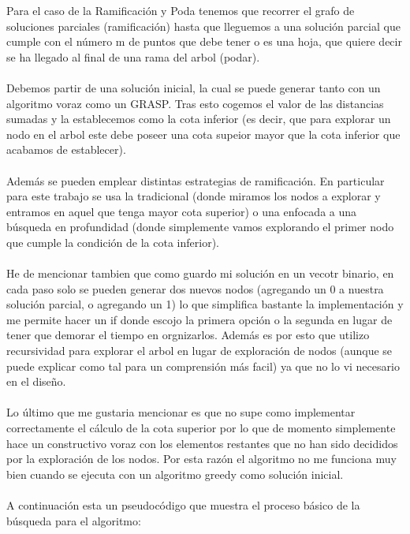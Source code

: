 Para el caso de la Ramificación y Poda tenemos que recorrer el grafo de soluciones parciales (ramificación) hasta que lleguemos a una solución parcial que cumple con el número m de puntos que debe tener o es una hoja, que quiere decir se ha llegado al final de una rama del arbol (podar).
\\
\\
Debemos partir de una solución inicial, la cual se puede generar tanto con un algoritmo voraz como un GRASP. Tras esto cogemos el valor de las distancias sumadas y la establecemos como la cota inferior (es decir, que para explorar un nodo en el arbol este debe poseer una cota supeior mayor que la cota inferior que acabamos de establecer).
\\
\\
Además se pueden emplear distintas estrategias de ramificación. En particular para este trabajo se usa la tradicional (donde miramos los nodos a explorar y entramos en aquel que tenga mayor cota superior) o una enfocada a una búsqueda en profundidad (donde simplemente vamos explorando el primer nodo que cumple la condición de la cota inferior).
\\
\\
He de mencionar tambien que como guardo mi solución en un vecotr binario, en cada paso solo se pueden generar dos nuevos nodos (agregando un 0 a nuestra solución parcial, o agregando un 1) lo que simplifica bastante la implementación y me permite hacer un if donde escojo la primera opción o la segunda en lugar de tener que demorar el tiempo en orgnizarlos. Además es por esto que utilizo recursividad para explorar el arbol en lugar de exploración de nodos (aunque se puede explicar como tal para un comprensión más facil) ya que no lo vi necesario en el diseño.
\\
\\
Lo último que me gustaria mencionar es que no supe como implementar correctamente el cálculo de la cota superior por lo que de momento simplemente hace un constructivo voraz con los elementos restantes que no han sido decididos por la exploración de los nodos. Por esta razón el algoritmo no me funciona muy bien cuando se ejecuta con un algoritmo greedy como solución inicial.
\\
\\
A continuación esta un pseudocódigo que muestra el proceso básico de la búsqueda para el algoritmo:

